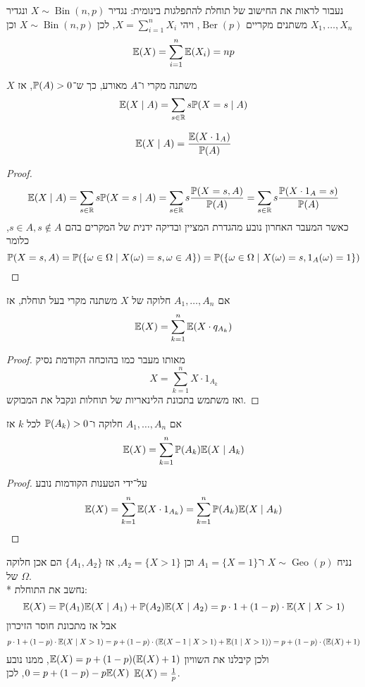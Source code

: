 \begin{example}
	נעבור לראות את החישוב של תוחלת להתפלגות בינומית:
	נגדיר $X \sim \operatorname{Bin}(n, p)$ ונגדיר $X_1, \dots, X_n$ משתנים מקריים $\operatorname{Ber}(p)$, ויהי $X = \sum_{i = 1}^n X_i$, לכן $X \sim \operatorname{Bin}(n, p)$ וכן
	\[
		\mathbb{E}(X) = \sum_{i = 1}^n \mathbb{E}(X_i) = np
	\]
\end{example}
\begin{definition}
	$X$ משתנה מקרי ו־$A$ מאורע, כך ש־$\mathbb{P}(A) > 0$, אז
	\[ 
		\mathbb{E}(X \mid A)
		= \sum_{s \in \mathbb{R}} s \mathbb{P}(X = s \mid A)
	\]
\end{definition}
\begin{proposition}
	\[
		\mathbb{E}(X \mid A) = \frac{\mathbb{E}(X \cdot 1_A)}{\mathbb{P}(A)}
	\]
\end{proposition}
\begin{proof}
	\[
		\mathbb{E}(X \mid A)
		= \sum_{s \in \mathbb{R}} s \mathbb{P}(X = s \mid A)
		= \sum_{s \in \mathbb{R}} s \frac{\mathbb{P}(X = s, A)}{\mathbb{P}(A)}
		= \sum_{s \in \mathbb{R}} s \frac{\mathbb{P}(X \cdot 1_A = s)}{\mathbb{P}(A)}
	\]
	כאשר המעבר האחרון נובע מהגדרת המציין ובדיקה ידנית של המקרים בהם $s \in A, s \notin A$, כלומר
	\[
		\mathbb{P}(X = s, A)
		= \mathbb{P}(\{\omega \in \Omega \mid X(\omega) = s, \omega \in A\})
		= \mathbb{P}(\{\omega \in \Omega \mid X(\omega) = s, 1_A(\omega) = 1\})
	\]
\end{proof}
\begin{proposition}
	אם $A_1, \dots, A_n$ חלוקה של $X$ משתנה מקרי בעל תוחלת, אז
	\[
		\mathbb{E}(X) = \sum_{k = 1}^n \mathbb{E}(X \cdot q_{A_k})
	\]
\end{proposition}
\begin{proof}
	מאותו מעבר כמו בהוכחה הקודמת נסיק
	\[
		X = \sum_{k = 1}^n X \cdot 1_{A_k}
	\]
	ואז משתמש בתכונת הלינאריות של תוחלות ונקבל את המבוקש.
\end{proof}
\begin{proposition}
	אם $A_1, \dots, A_n$ חלוקה ו־$\mathbb{P}(A_k) > 0$ לכל $k$ אז
	\[
		\mathbb{E}(X) = \sum_{k = 1}^n \mathbb{P}(A_k) \mathbb{E}(X \mid A_k)
	\]
\end{proposition}
\begin{proof}
	על־ידי הטענות הקודמות נובע
	\[
		\mathbb{E}(X)
		= \sum_{k = 1}^n \mathbb{E}(X \cdot 1_{A_k})
		= \sum_{k = 1}^n \mathbb{P}(A_k) \mathbb{E}(X \mid A_k)
	\]
\end{proof}
\begin{example}
	נניח $X \sim \operatorname{Geo}(p)$ ו־$A_1 = \{X = 1\}$ וכן $A_2 = \{X > 1\}$, אז $\{A_1, A_2\}$ הם אכן חלוקה של $\Omega$. \\*
	נחשב את התוחלת:
	\[
		\mathbb{E}(X)
		= \mathbb{P}(A_1) \mathbb{E}(X \mid A_1) + \mathbb{P}(A_2) \mathbb{E}(X \mid A_2)
		= p \cdot 1 + (1 - p) \cdot \mathbb{E}(X \mid X > 1)
	\]
	אבל אז מתכונת חוסר הזיכרון
	\[
		p \cdot 1 + (1 - p) \cdot \mathbb{E}(X \mid X > 1)
		= p + (1 - p) \cdot (\mathbb{E}(X - 1 \mid X > 1) + \mathbb{E}(1 \mid X > 1))
		= p + (1 - p) \cdot (\mathbb{E}(X) + 1)
	\]
	ולכן קיבלנו את השוויון $\mathbb{E}(X) = p + (1 - p)(\mathbb{E}(X) + 1)$, ממנו נובע $0 = p + (1 - p) - p \mathbb{E}(X)$, לכן $\mathbb{E}(X) = \frac{1}{p}$.
\end{example}

